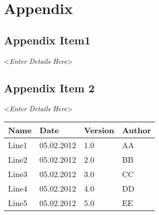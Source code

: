 \documentclass[english,12pt]{scrartcl}
\newcommand{\comment}[1]{\textless\textit{#1}\textgreater\vspace*{1ex}}
\begin{document}
\section{Appendix}
 
\subsection{Appendix Item1 }
 
\comment{Enter Details Here}
 
\subsection{Appendix Item 2}
 
\comment{Enter Details Here}
 
\begin{tabular}{p{}p{}p{}p{}} \toprule
Name &Date&Version & Author \\ \midrule
Line1 & 05.02.2012 & 1.0 & AA \\ 
Line2 & 05.02.2012 & 2.0 & BB \\ 
Line3 & 05.02.2012 & 3.0 & CC \\ 
Line4 & 05.02.2012 & 4.0 & DD \\ 
Line5 & 05.02.2012 & 5.0 & EE \\ \bottomrule
\end{tabular}		
\end{document}
